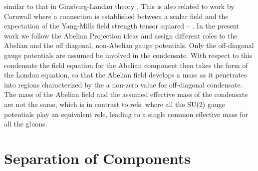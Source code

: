 \documentclass[a4paper,aps,showpacs]{revtex4}
\begin{document}
similar to that in Ginzburg-Landau theory \cite{gl}. This
is also related to work by Cornwall \cite{cw} \cite{cw1} where a
connection is established between a scalar field and the expectation
of the Yang-Mills field strength tensor squared -- \coordHE{}. In the
present work we follow the Abelian Projection ideas and
assign different roles to the Abelian and the off diagonal,
non-Abelian gauge potentials. Only the off-diagonal gauge
potentials are assumed be involved in the condensate. With
respect to this condensate the field equation
for the Abelian component then takes the form
of the London equation, so that the Abelian field develops
a mass as it penetrates into regions characterized by the
a non-zero value for off-diagonal
condensate. The mass of the Abelian field and the
assumed effective mass of the condensate are not the same, which
is in contrast to refs. \cite{cw} \cite{cw1} where all the SU(2)
gauge potentials play an equivalent role, leading to a single
common effective mass for all the gluons.

\section{Separation of Components}
\end{document}
